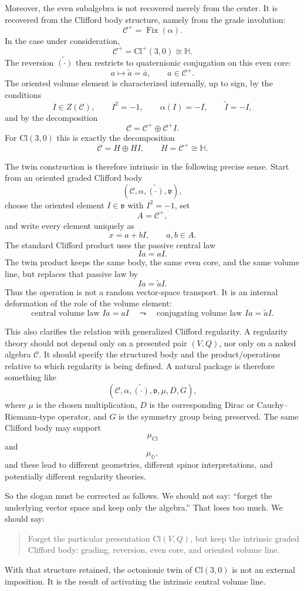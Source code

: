 \documentclass[11pt]{article}
\newcommand{\Cl}{\mathrm{Cl}}
\newcommand{\OO}{\mathbb O}
\begin{document}
Moreover, the even subalgebra is not recovered merely from the center. It is
recovered from the Clifford body structure, namely from the grade involution:
\[
\mathcal C^+=\operatorname{Fix}(\alpha).
\]
In the case under consideration,
\[
\mathcal C^+=\Cl^+(3,0)\cong\mathbb H.
\]
The reversion $\widetilde{(\cdot)}$ then restricts to quaternionic conjugation
on this even core:
\[
a\mapsto \widetilde a=\bar a,
\qquad a\in \mathcal C^+.
\]
The oriented volume element is characterized internally, up to sign, by the
conditions
\[
I\in Z(\mathcal C),
\qquad
I^2=-1,
\qquad
\alpha(I)=-I,
\qquad
\widetilde I=-I,
\]
and by the decomposition
\[
\mathcal C=\mathcal C^+\oplus \mathcal C^+I.
\]
For $\Cl(3,0)$ this is exactly the decomposition
\[
\mathcal C=H\oplus HI,
\qquad H=\mathcal C^+\cong\mathbb H.
\]

The twin construction is therefore intrinsic in the following precise sense.
Start from an oriented graded Clifford body
\[
(\mathcal C,\alpha,\widetilde{(\cdot)},\mathfrak v),
\]
choose the oriented element $I\in\mathfrak v$ with $I^2=-1$, set
\[
A=\mathcal C^+,
\]
and write every element uniquely as
\[
x=a+bI,
\qquad a,b\in A.
\]
The standard Clifford product uses the passive central law
\[
Ia=aI.
\]
The twin product keeps the same body, the same even core, and the same volume
line, but replaces that passive law by
\[
Ia=\widetilde a I.
\]
Thus the operation is not a random vector-space transport. It is an internal
deformation of the role of the volume element:
\[
\boxed{
\text{central volume law } Ia=aI
\quad\leadsto\quad
\text{conjugating volume law } Ia=\widetilde a I.
}
\]

This also clarifies the relation with generalized Clifford regularity. A
regularity theory should not depend only on a presented pair $(V,Q)$, nor only
on a naked algebra $\mathcal C$. It should specify the structured body and the
product/operations relative to which regularity is being defined. A natural
package is therefore something like
\[
(\mathcal C,\alpha,\widetilde{(\cdot)},\mathfrak v,\mu,D,G),
\]
where $\mu$ is the chosen multiplication, $D$ is the corresponding Dirac or
Cauchy--Riemann-type operator, and $G$ is the symmetry group being preserved.
The same Clifford body may support
\[
\mu_{\Cl}
\]
and
\[
\mu_{\OO},
\]
and these lead to different geometries, different spinor interpretations, and
potentially different regularity theories.

So the slogan must be corrected as follows. We should not say: ``forget the
underlying vector space and keep only the algebra.'' That loses too much. We
should say:
\begin{quote}
Forget the particular presentation $\Cl(V,Q)$, but keep the intrinsic graded
Clifford body: grading, reversion, even core, and oriented volume line.
\end{quote}
With that structure retained, the octonionic twin of $\Cl(3,0)$ is not an
external imposition. It is the result of activating the intrinsic central
volume line.
\end{document}
